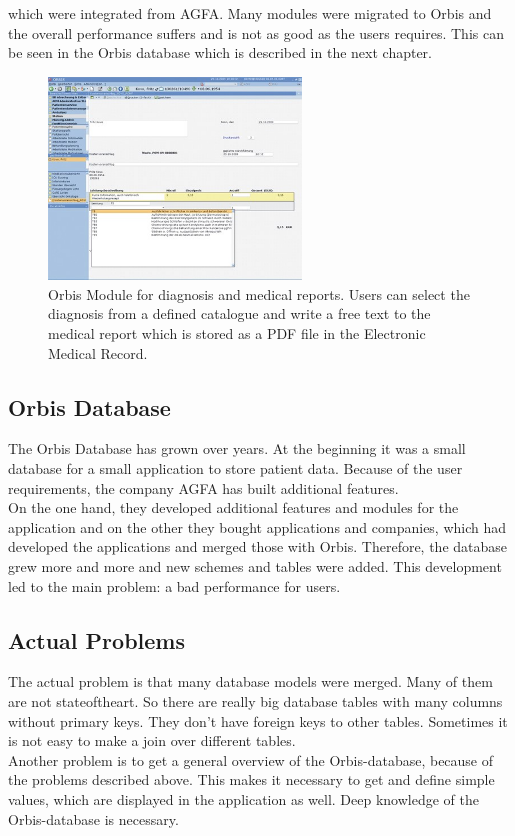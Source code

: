 \documentclass[a4paper]{article}
\begin{document}
	which were integrated from AGFA. Many modules were migrated to Orbis and
	the overall performance suffers and is not as good as the users requires.
	This can be seen in the Orbis database which is described in the next chapter.\\
	\begin{figure}[!ht]
		  \centering
		      \includegraphics[width=0.6\textwidth]{orbis2}
		  \caption{Orbis Module for diagnosis and medical reports. Users can
		  select the diagnosis from a defined catalogue and write a free text to the
		  medical report which is stored as a PDF file in the Electronic Medical
		  Record.}
	\end{figure}
	\subsection{Orbis Database}
	The Orbis Database has grown over years. At the beginning it was a small
	database for a small application to store patient data. Because of the user
	requirements, the company AGFA has built additional features. \\
	On the one hand, they developed additional features and modules for the
	application and on the other they bought applications and companies, which had developed
	the applications and merged those with Orbis. Therefore, the database grew
	more and more and new schemes and tables were added. This development led to
	the main problem: a bad performance for users.
	\subsection{Actual Problems}
	The actual problem is that many database models were merged. Many of
	them are not stateoftheart. So there are really big database tables with
	many columns without primary keys. They don't have foreign keys to
	other tables. Sometimes it is not easy to make a join over different tables.\\
	Another problem is to get a general overview of the Orbis-database, because
	of the problems described above. This makes it necessary to get and define simple values, which are displayed in the application as well. Deep
	knowledge of the Orbis-database is necessary.
\end{document}
